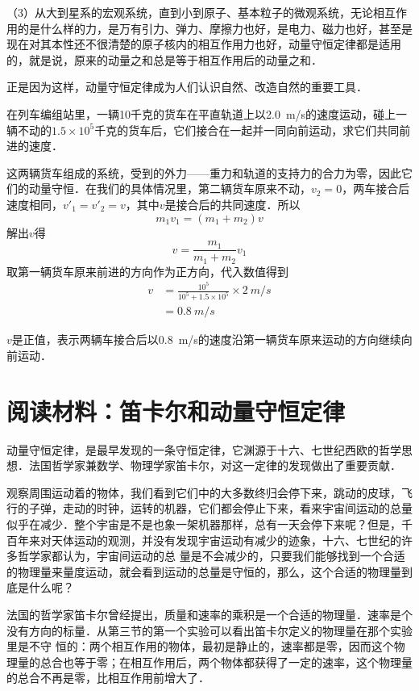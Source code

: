 （3）从大到星系的宏观系统，直到小到原子、基本粒子的微观系统，无论相互作用的是什么样的力，是万有引力、弹力、摩擦力也好，是电力、磁力也好，甚至是现在对其本性还不很清楚的原子核内的相互作用力也好，动量守恒定律都是适用的，就是说，原来的动量之和总是等于相互作用后的动量之和．

正是因为这样，动量守恒定律成为人们认识自然、改造自然的重要工具．


\begin{example}
    在列车编组站里，一辆10千克的货车在平直轨道上以\qty{2.0}{m/s}的速度运动，碰上一辆不动的$1.5\times 10^5$千克的货车后，它们接合在一起并一同向前运动，求它们共同前进的速度．
\end{example}


\begin{solution}
    这两辆货车组成的系统，受到的外力——重力和轨道的支持力的合力为零，因此它们的动量守恒．在我们的具体情况里，第二辆货车原来不动，$v_2=0$，两车接合后速度相同，$v'_1=v'_2=v$，其中$v$是接合后的共同速度．所以
    \[m_1v_1=(m_1+m_2)v \]
    解出$v$得
    \[v=\frac{m_1}{m_1+m_2}v_1\]
    取第一辆货车原来前进的方向作为正方向，代入数值得到
    \[\begin{split}
            v & =\frac{10^5}{10^5+1.5\times 10^5}\times \qty{2}{m/s} \\
              & =\qty{0.8}{m/s}
        \end{split}\]
\end{solution}
$v$是正值，表示两辆车接合后以\qty{0.8}{m/s}的速度沿第一辆货车原来运动的方向继续向前运动．


\section*{阅读材料：笛卡尔和动量守恒定律}
动量守恒定律，是最早发现的一条守恒定律，它渊源于十六、七世纪西欧的哲学思想．法国哲学家兼数学、物理学家笛卡尔，对这一定律的发现做出了重要贡献．

观察周围运动着的物体，我们看到它们中的大多数终归会停下来，跳动的皮球，飞行的子弹，走动的时钟，运转的机器，它们都会停止下来，看来宇宙间运动的总量似乎在减少．整个宇宙是不是也象一架机器那样，总有一天会停下来呢？但是，千百年来对天体运动的观测，并没有发现宇宙运动有减少的迹象，十六、七世纪的许多哲学家都认为，宇宙间运动的总
量是不会减少的，只要我们能够找到一个合适的物理量来量度运动，就会看到运动的总量是守恒的，那么，这个合适的物理量到底是什么呢？

法国的哲学家笛卡尔曾经提出，质量和速率的乘积是一个合适的物理量．速率是个没有方向的标量．从第三节的第一个实验可以看出笛卡尔定义的物理量在那个实验里是不守
恒的：两个相互作用的物体，最初是静止的，速率都是零，因而这个物理量的总合也等于零；在相互作用后，两个物体都获得了一定的速率，这个物理量的总合不再是零，比相互作用前增大了．

